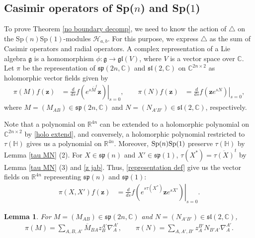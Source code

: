 \documentclass[a4paper,11pt]{amsart}
\numberwithin{equation}{section}
\newtheorem{lem}{Lemma}[section]
\begin{document}
\subsection{Casimir operators of {\rm Sp}($n$) and {\rm Sp}($1$)}
To prove Theorem \ref{no boundary decomp}, we need to know the action of $\triangle$ on the Sp$(n)$Sp$(1)$-modules $\mathcal{H}_{a,b}$. For this purpose, we express $\triangle$ as the sum of Casimir operators and radial operators. A complex representation of a Lie algebra $\mathfrak{g}$ is a homomorphism $\phi:\mathfrak{g}\rightarrow \mathfrak{gl}(V)$, where $V$ is a vector space over $\mathbb{C}$.
Let $\pi$ be the representation of $\mathfrak{sp}(2n,\mathbb{C})$ and $\mathfrak{sl}(2,\mathbb{C})$ on $\mathbb{C}^{2n\times 2}$ as holomorphic vector fields given by
\begin{equation}\begin{aligned}\label{representation def}
\pi(M)f(\mathbf{z})&=\left.\frac{d}{ds}f\left(e^{s\overline{M}^t}\mathbf{z} \right)\right|_{s=0}, \qquad \pi(N)f(\mathbf{z})&=\left.\frac{d}{ds}f\left(\mathbf{z}e^{sN} \right)\right|_{s=0},
\end{aligned}\end{equation}
where $M=(M_{AB})\in \mathfrak{sp}(2n,\mathbb{C})$ and $N=(N_{A'B'})\in \mathfrak{sl}(2,\mathbb{C})$, respectively.


 Note that a polynomial on $\mathbb{R}^{4n}$ can be extended to a holomorphic polynomial on $\mathbb{C}^{2n\times 2}$ by \eqref{holo extend}, and conversely, a holomorphic polynomial restricted to $\tau(\mathbb{H})$ gives us a polynomial on $\mathbb{R}^{4n}$. Moreover, ${\rm Sp}(n){\rm Sp}(1)$ preserve $\tau(\mathbb{H})$ by Lemma \ref{tau MN} (2). For $X\in\mathfrak{sp}(n)$ and $X'\in\mathfrak{sp}(1)$, $\tau(X^*)=\overline{\tau(X)}^t$ by Lemma \ref{tau MN} (3) and \eqref{z jab}. Thus, \eqref{representation def} give us the vector fields on $\mathbb{R}^{4n}$ representing $\mathfrak{sp}(n)$ and $\mathfrak{sp}(1):$
\begin{equation}\begin{aligned}\label{representation defd}
\pi(X,X')f(\mathbf{z})&=\left.\frac{d}{ds}f\left(e^{s\tau(X^{*})}\mathbf{z}e^{sX'} \right)\right|_{s=0}.
\end{aligned}\end{equation}


\begin{lem}\label{lemma lie}
For $M=(M_{AB})\in \mathfrak{sp}(2n,\mathbb{C})$ and $N=(N_{A'B'})\in \mathfrak{sl}(2,\mathbb{C})$,
\begin{equation}\begin{aligned}\label{lie}
\pi(M)=\sum_{A,B,A'}\overline{M}_{BA}z_B^{A'}\nabla_A^{A'},\qquad\pi(N)=\sum_{A,A',B'}z_A^{B'}N_{B'A'}\nabla_A^{A'}.
\end{aligned}\end{equation}
\end{lem}
\end{document}
